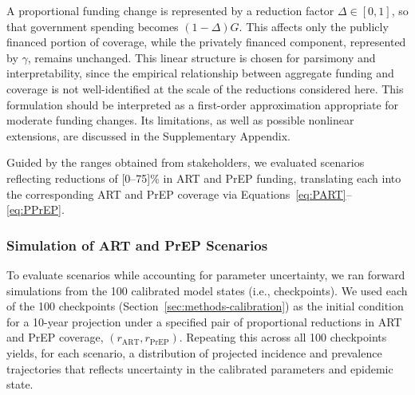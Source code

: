 \documentclass[preprint,12pt]{elsarticle}
\begin{document}
A proportional funding change is represented by a reduction factor $\Delta \in [0,1]$, so that government spending becomes $(1-\Delta)G$. This affects only the publicly financed portion of coverage, while the privately financed component, represented by $\gamma$, remains unchanged. This linear structure is chosen for parsimony and interpretability, since the empirical relationship between aggregate funding and coverage is not well-identified at the scale of the reductions considered here. This formulation should be interpreted as a first-order approximation appropriate for moderate funding changes. Its limitations, as well as possible nonlinear extensions, are discussed in the Supplementary Appendix.




Guided by the ranges obtained from stakeholders, we evaluated scenarios reflecting reductions of [0--75]\% in ART and PrEP funding, translating each into the corresponding ART and PrEP coverage via Equations~\eqref{eq:PART}--\eqref{eq:PPrEP}. 


\subsubsection{Simulation of ART and PrEP Scenarios}

To evaluate scenarios while accounting for parameter uncertainty, we ran forward simulations from the 100 calibrated model states (i.e., checkpoints). We used each of the 100 checkpoints (Section~\ref{sec:methods-calibration}) as the initial condition for a 10-year projection under a specified pair of proportional reductions in ART and PrEP coverage, $(r_{\mathrm{ART}}, r_{\mathrm{PrEP}})$. Repeating this across all 100 checkpoints yields, for each scenario, a distribution of projected incidence and prevalence trajectories that reflects uncertainty in the calibrated parameters and epidemic state.
\end{document}
